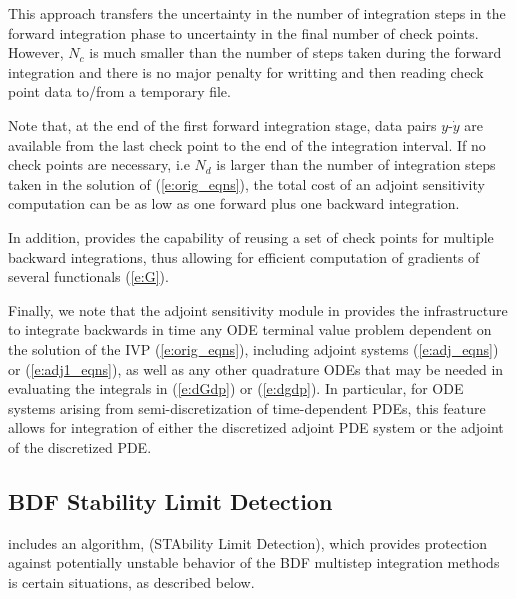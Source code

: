 This approach transfers the uncertainty in the number of integration
steps in the forward integration phase to uncertainty in the final number of check 
points. However, $N_c$ is much smaller than the number of steps taken during
the forward integration and there is no major penalty for writting and then reading
check point data to/from a temporary file.

Note that, at the end of the first forward integration stage, data pairs 
$y$-${\dot y}$ are available from the last check point to the end of the integration 
interval. If no check points are necessary, i.e $N_d$ is larger than the 
number of integration steps taken in the solution of (\ref{e:orig_eqns}),
the total cost of an adjoint sensitivity computation can be as low as one forward
plus one backward integration.

In addition, {\cvodes} provides the capability of reusing a set of check points
for multiple backward integrations, thus allowing for efficient computation of
gradients of several functionals (\ref{e:G}).

\bigskip

Finally, we note that the adjoint sensitivity module in {\cvodes} provides the 
infrastructure to integrate backwards in time any ODE terminal value problem
dependent on the solution of the IVP (\ref{e:orig_eqns}), including
adjoint systems (\ref{e:adj_eqns}) or (\ref{e:adj1_eqns}), as well as any other
quadrature ODEs that may be needed in evaluating the integrals in (\ref{e:dGdp}) 
or (\ref{e:dgdp}). In particular, for ODE systems arising from semi-discretization
of time-dependent PDEs, this feature allows for integration of either the 
discretized adjoint PDE system or the adjoint of the discretized PDE.


\subsection{BDF Stability Limit Detection}

{\cvodes} includes an algorithm, {\stald} (STAbility Limit Detection),
which provides protection against potentially unstable behavior of the 
BDF multistep integration methods is certain situations, as described below.

